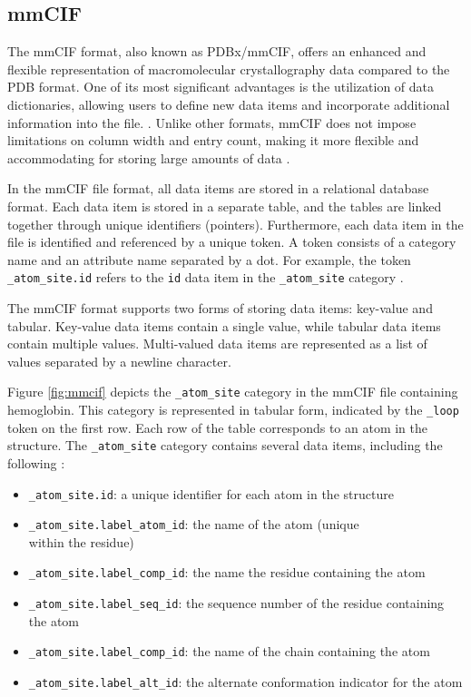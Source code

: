 \documentclass[
  digital,     %
  oneside,     %
  nosansbold,  %
  nocolorbold, %
  lof,         %
  lot,         %
]{fithesis4}
\begin{document}
\subsection{mmCIF}
\label{subsection:mmcif}

The mmCIF format, also known as PDBx/mmCIF, offers an enhanced and flexible representation of macromolecular crystallography data compared to the PDB format. \cite{} One of its most significant advantages is the utilization of data dictionaries, allowing users to define new data items and incorporate additional information into the file. \cite{pdb101}. Unlike other formats, mmCIF does not impose limitations on column width and entry count, making it more flexible and accommodating for storing large amounts of data \cite{pdb101}.

In the mmCIF file format, all data items are stored in a relational database format. Each data item is stored in a separate table, and the tables are linked together through unique identifiers (pointers). Furthermore, each data item in the file is identified and referenced by a unique token. A token consists of a category name and an attribute name separated by a dot. For example, the token \texttt{\_atom\_site.id} refers to the \texttt{id} data item in the \texttt{\_atom\_site} category \cite{pdb101}.

The mmCIF format supports two forms of storing data items: key-value and tabular. Key-value data items contain a single value, while tabular data items contain multiple values. Multi-valued data items are represented as a list of values separated by a newline character. \cite{pdb101}

Figure \ref{fig:mmcif} depicts the \texttt{\_atom\_site} category in the mmCIF file containing hemoglobin. This category is represented in tabular form, indicated by the \texttt{\_loop} token on the first row. Each row of the table corresponds to an atom in the structure. The \texttt{\_atom\_site} category contains several data items, including the following \cite{mmcif_dictionary}:

\begin{itemize}
  \item \texttt{\_atom\_site.id}: a unique identifier for each atom in the structure
  \item \texttt{\_atom\_site.label\_atom\_id}: the name of the atom (unique \\
  within the residue)
  \item \texttt{\_atom\_site.label\_comp\_id}: the name the residue containing the atom
  \item \texttt{\_atom\_site.label\_seq\_id}: the sequence number of the residue containing the atom
  \item \texttt{\_atom\_site.label\_comp\_id}: the name of the chain containing the atom
  \item \texttt{\_atom\_site.label\_alt\_id}: the alternate conformation indicator for the atom
\end{itemize}
\end{document}
